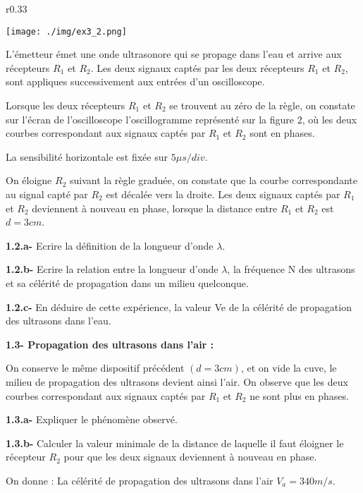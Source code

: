 \documentclass[12pt, french]{article}
\begin{document}
  \begin{wrapfigure}[10]{r}{0.33\textwidth}
  \begin{center}
	  \vspace{-0.6cm}
	\texttt{[image: ./img/ex3\_2.png]}
  \end{center}
\end{wrapfigure}



L’émetteur émet une onde ultrasonore qui se propage dans l’eau
et arrive aux récepteurs $R_1$ et $R_2$. Les deux signaux captés par les
deux récepteurs $R_1$ et $R_2$, sont appliques successivement aux
entrées d’un oscilloscope.

Lorsque les deux récepteurs $R_1$ et $R_2$ se trouvent au zéro de la
règle, on constate sur l’écran de l’oscilloscope l’oscillogramme
représenté sur la figure 2, où les deux courbes correspondant aux
signaux captés par $R_1$ et $R_2$ sont en phases.

La sensibilité horizontale est fixée sur $5 \mu{s}/div$.

On éloigne $R_2$ suivant la règle graduée, on constate que la courbe correspondante au signal capté par
$R_2$ est décalée vers la droite. Les deux signaux captés par $R_1$ et $R_2$ deviennent à nouveau en phase, lorsque la distance entre $R_1$ et $R_2$ est $d = 3 cm$.

\textbf{1.2.a- }Ecrire la définition de la longueur d’onde $\lambda$.

\textbf{1.2.b- }Ecrire la relation entre la longueur d’onde $\lambda$, la fréquence N des ultrasons et sa célérité de
propagation dans un milieu quelconque.

\textbf{1.2.c- }En déduire de cette expérience, la valeur Ve de la célérité de propagation des ultrasons dans l’eau.

\textbf{1.3- Propagation des ultrasons dans l’air :\dotfill }

On conserve le même dispositif précédent $(d = 3 cm)$, et on vide la cuve, le milieu de propagation des ultrasons devient ainsi l’air. On observe que les deux courbes correspondant aux signaux captés par $R_1$ et $R_2$ ne sont plus en phases.

\textbf{1.3.a- }Expliquer le phénomène observé.

\textbf{1.3.b- }Calculer la valeur minimale de la distance de laquelle il faut éloigner le récepteur $R_2$ pour que les deux signaux deviennent à nouveau en phase.

On donne : La célérité de propagation des ultrasons dans l’air $V_a = 340 m/s$.
\end{document}
